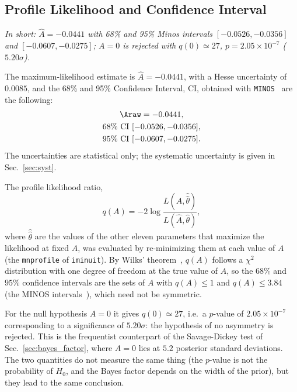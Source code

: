 \subsection{Profile Likelihood and Confidence Interval}
\label{sec:freq_ci}
\emph{In short: $\hat A=-0.0441$ with 68\% and 95\% Minos intervals $[-0.0526,-0.0356]$ and $[-0.0607,-0.0275]$; $A=0$ is rejected with $q(0)\simeq27$, $p=2.05\times10^{-7}$ ($5.20\sigma$).}


The maximum-likelihood estimate is $\hat A=-0.0441$, with a Hesse uncertainty of $0.0085$, and the 68\% and 95\% Confidence Interval, CI, obtained with \texttt{MINOS}~\cite{minuit} are the following:
\begin{gather*}
\Araw = -0.0441, \\
68\%~\text{CI}~[-0.0526, -0.0356], \\ 95\%~\text{CI}~[-0.0607, -0.0275].
\end{gather*}
The uncertainties are statistical only; the systematic uncertainty is given in Sec.~\ref{sec:syst}.

The profile likelihood ratio,
\[
q(A) = -2\log\frac{L(A,\hat{\hat\theta})}{L(\hat A,\hat\theta)},
\]
where $\hat{\hat\theta}$ are the values of the other eleven parameters that maximize the likelihood at fixed $A$, was evaluated by re-minimizing them at each value of $A$ (the \texttt{mnprofile} of \texttt{iminuit}).
By Wilks' theorem~\cite{wilks}, $q(A)$ follows a $\chi^2$ distribution with one degree of freedom at the true value of $A$, so the $68\%$ and $95\%$ confidence intervals are the sets of $A$ with $q(A)\leq1$ and $q(A)\leq3.84$ (the MINOS intervals~\cite{minuit}), which need not be symmetric.


For the null hypothesis $A=0$ it gives $q(0)\simeq27$, i.e.\ a $p$-value of $2.05\times10^{-7}$ corresponding to a significance of $5.20\sigma$: the hypothesis of no asymmetry is rejected. This is the frequentist counterpart of the Savage-Dickey test of Sec.~\ref{sec:bayes_factor}, where $A=0$ lies at $5.2$ posterior standard deviations.%
The two quantities do not measure the same thing (the $p$-value is not the probability of $H_0$, and the Bayes factor depends on the width of the prior), but they lead to the same conclusion.


